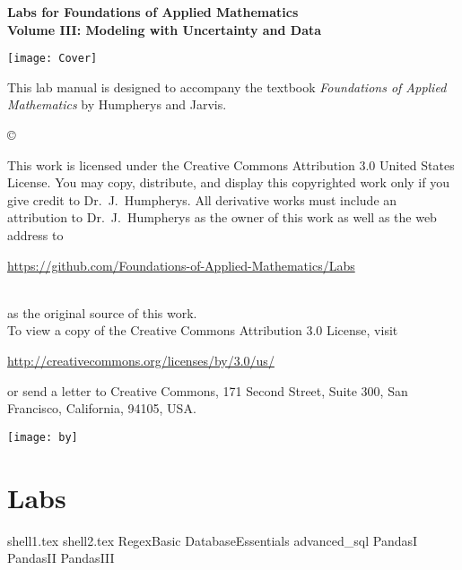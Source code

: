 \documentclass[nociteref]{SIAM-GH-book}
\begin{document}

\thispagestyle{empty} %

\begin{center}
{\huge \bf Labs for Foundations of Applied Mathematics} \\
\vspace{5mm}
{\Large \bf Volume III: Modeling with Uncertainty and Data}
\vspace{20mm}

\texttt{[image: Cover]}
\end{center}
\frontmatter



\begin{thepreface} %

This lab manual is designed to accompany the textbook \emph{Foundations of Applied Mathematics} by Humpherys and Jarvis.

\vfill
\copyright{This work is licensed under the Creative Commons Attribution 3.0 United States
License.  You may copy, distribute, and display this copyrighted work only if you give
credit to Dr.~J.~Humpherys. All derivative works must include an attribution to Dr.~J.~Humpherys as the owner of this work as well as the web address to
\\\centerline{\url{https://github.com/Foundations-of-Applied-Mathematics/Labs}}\\as the original source of this work.
\\To view a copy of the Creative Commons Attribution 3.0 License, visit
\\\centerline{\url{http://creativecommons.org/licenses/by/3.0/us/}} or send a letter to Creative Commons, 171 Second Street, Suite 300, San Francisco, California, 94105, USA.}

\vfill
\centering\texttt{[image: by]}
\vfill
\end{thepreface}

\setcounter{tocdepth}{1}
\tableofcontents

\mainmatter %


\part{Labs}
{shell1.tex}
{shell2.tex}
{RegexBasic}
{DatabaseEssentials}
{advanced_sql}
{PandasI}
{PandasII}
{PandasIII}
\end{document}
